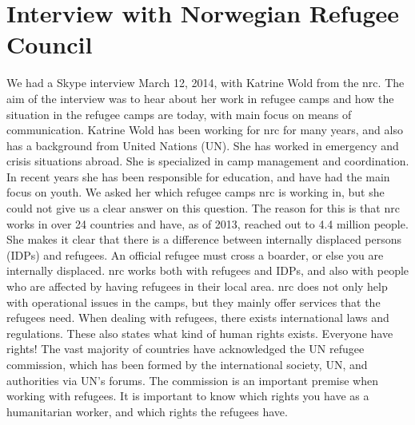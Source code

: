 \section{Interview with Norwegian Refugee Council}
\label{sec:interviewnrc}
We had a Skype interview March 12, 2014, with Katrine Wold from the \gls{nrc}. The aim of the interview was to hear about her work in refugee camps and how the situation in the refugee camps are today, with main focus on means of communication.
Katrine Wold has been working for \gls{nrc} for many years, and also has a background from United Nations (UN). She has worked in emergency and crisis situations abroad. She is specialized in camp management and coordination. In recent years she has been responsible for education, and have had the main focus on youth. We asked her which refugee camps \gls{nrc} is working in, but she could not give us a clear answer on this question. The reason for this is that \gls{nrc} works in over 24 countries and have, as of 2013, reached out to 4.4 million people. She makes it clear that there is a difference between internally displaced persons (IDPs) and refugees. An official refugee must cross a boarder, or else you are internally displaced. \gls{nrc} works both with refugees and IDPs, and also with people who are affected by having refugees in their local area. \gls{nrc} does not only help with operational issues in the camps, but they mainly offer services that the refugees need. When dealing with refugees, there exists international laws and regulations. These also states what kind of human rights exists. Everyone have rights! The vast majority of countries have acknowledged the UN refugee commission, which has been formed by the international society, UN, and authorities via UN's forums. The commission is an important premise when working with refugees. It is important to know which rights you have as a humanitarian worker, and which rights the refugees have. 

